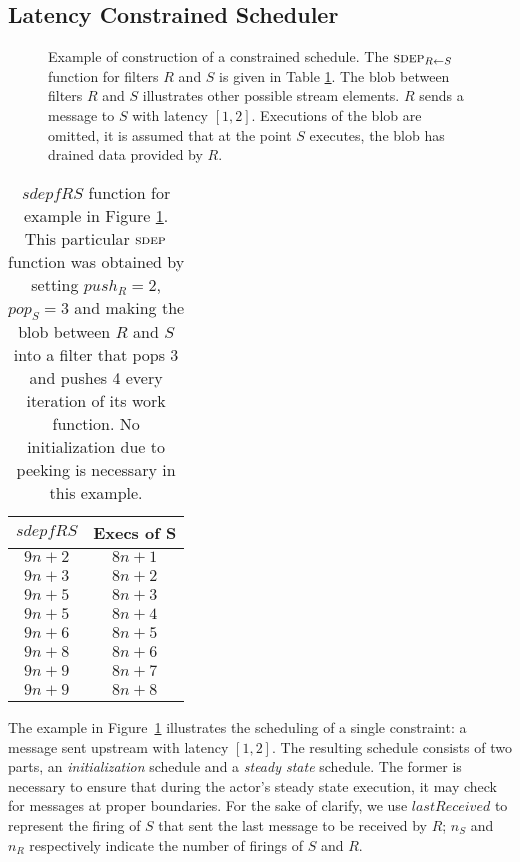 \subsection{Latency Constrained Scheduler}

\begin{figure}[t]
\begin{center}
\caption{{\small Example of construction of a constrained schedule. The $\sdepf{R}{S}$ function for filters $R$ and $S$ is given in Table \ref{tab:sdepconst}. The blob between filters $R$ and $S$ illustrates other possible stream elements. $R$ sends a message to $S$ with latency $[1,2]$. Executions of the blob are omitted, it is assumed that at the point $S$ executes, the blob has drained data provided by $R$.}}
\end{center}
\vspace{-12pt}
\label{fig:sdepconst}
\end{figure}

\begin{table*}[t]
{\small
\begin{tabular}{|c|c|} \hline
{\bf $sdepf{R}{S}$} & {\bf Execs of S} \\ \hline
$9n+2$ & $8n+1$ \\ \hline
$9n+3$ & $8n+2$ \\ \hline
$9n+5$ & $8n+3$ \\ \hline
$9n+5$ & $8n+4$ \\ \hline
$9n+6$ & $8n+5$ \\ \hline
$9n+8$ & $8n+6$ \\ \hline
$9n+9$ & $8n+7$ \\ \hline
$9n+9$ & $8n+8$ \\ \hline
\end{tabular}}
\caption{\small $sdepf{R}{S}$ function for example in Figure \ref{fig:sdepconst}. This particular $\textsc{sdep}$ function was obtained by setting $push_R=2$, $pop_S=3$ and making the blob between $R$ and $S$ into a filter that pops 3 and pushes 4 every iteration of its work function. No initialization due to peeking is necessary in this example.}
\label{tab:sdepconst}
\end{table*}

The example  in Figure~\ref{fig:sdepconst} illustrates  the scheduling
of a single constraint: a  message sent upstream with latency $[1,2]$.
The resulting schedule consists  of two parts, an {\it initialization}
schedule and a  {\it steady state} schedule.  The  former is necessary
to ensure that during the actor's steady state execution, it may check
for messages  at proper boundaries.  For  the sake of  clarify, we use
$lastReceived$  to represent  the firing  of  $S$ that  sent the  last
message to be  received by $R$; $n_S$ and  $n_R$ respectively indicate
the number of firings of $S$ and $R$.


